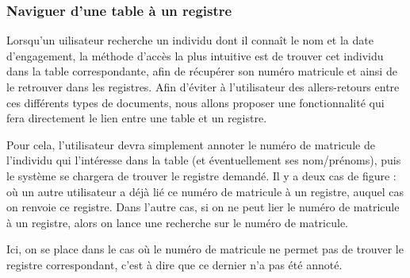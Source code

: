 \documentclass[a4paper]{article}
\begin{document}
\subsubsection{Naviguer d'une table à un registre}

Lorsqu'un uilisateur recherche un individu dont il connaît le nom et la date d'engagement, la méthode d'accès la plus intuitive est de trouver cet individu dans la table correspondante, afin de récupérer son numéro matricule et ainsi de le retrouver dans les registres. Afin d'éviter à l'utilisateur des allers-retours entre ces différents types de documents, nous allons proposer une fonctionnalité qui fera directement le lien entre une table et un registre.

Pour cela, l'utilisateur devra simplement annoter le numéro de matricule de l'individu qui l'intéresse dans la table (et éventuellement ses nom/prénoms), puis le système se chargera de trouver le registre demandé. Il y a deux cas de figure : où un autre utilisateur a déjà lié ce numéro de matricule à un registre, auquel cas on renvoie ce registre. Dans l'autre cas, si on ne peut lier le numéro de matricule à un registre, alors on lance une recherche sur le numéro de matricule. 


Ici, on se place dans le cas où le numéro de matricule ne permet pas de trouver le registre correspondant, c'est à dire que ce dernier n'a pas été annoté. 
\end{document}
